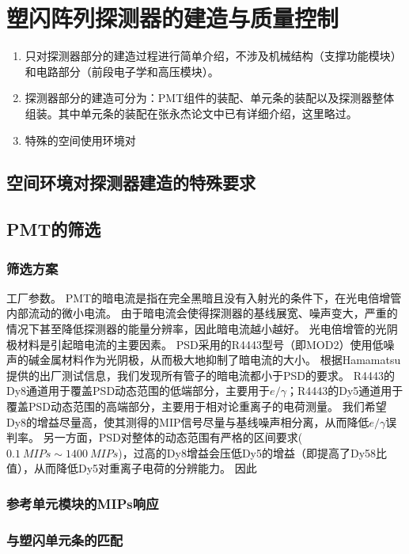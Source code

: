 \chapter{塑闪阵列探测器的建造与质量控制}
\label{ch:construction}
\begin{enumerate}
	\item 只对探测器部分的建造过程进行简单介绍，不涉及机械结构（支撑功能模块）和电路部分（前段电子学和高压模块）。
	\item 探测器部分的建造可分为：PMT组件的装配、单元条的装配以及探测器整体组装。其中单元条的装配在张永杰论文中已有详细介绍，这里略过。
	\item 特殊的空间使用环境对
\end{enumerate}

\section{空间环境对探测器建造的特殊要求}

\section{PMT的筛选}
\subsection{筛选方案}
工厂参数。
PMT的暗电流是指在完全黑暗且没有入射光的条件下，在光电倍增管内部流动的微小电流。
由于暗电流会使得探测器的基线展宽、噪声变大，严重的情况下甚至降低探测器的能量分辨率，因此暗电流越小越好。
光电倍增管的光阴极材料是引起暗电流的主要因素。
PSD采用的R4443型号（即MOD2）使用低噪声的碱金属材料作为光阴极，从而极大地抑制了暗电流的大小。
根据Hamamatsu提供的出厂测试信息，我们发现所有管子的暗电流都小于PSD的要求。
R4443的Dy8通道用于覆盖PSD动态范围的低端部分，主要用于$e/\gamma$；R4443的Dy5通道用于覆盖PSD动态范围的高端部分，主要用于相对论重离子的电荷测量。
我们希望Dy8的增益尽量高，使其测得的MIP信号尽量与基线噪声相分离，从而降低$e/\gamma$误判率。
另一方面，PSD对整体的动态范围有严格的区间要求($\SI{0.1}{MIPs}\sim\SI{1400}{MIPs}$)，过高的Dy8增益会压低Dy5的增益（即提高了Dy58比值），从而降低Dy5对重离子电荷的分辨能力。
因此
\subsection{参考单元模块的MIPs响应}
\subsection{与塑闪单元条的匹配}

